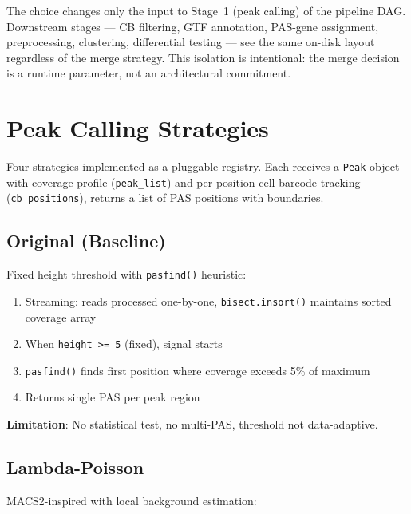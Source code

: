 \documentclass[11pt,a4paper]{article}
\begin{document}
The choice changes only the input to Stage~1 (peak calling) of the pipeline
DAG. Downstream stages --- CB filtering, GTF annotation, PAS-gene assignment,
preprocessing, clustering, differential testing --- see the same on-disk
layout regardless of the merge strategy. This isolation is intentional:
the merge decision is a runtime parameter, not an architectural commitment.

\section{Peak Calling Strategies}
\label{sec:peak_calling}

Four strategies implemented as a pluggable registry. Each receives a \texttt{Peak}
object with coverage profile (\texttt{peak\_list}) and per-position cell barcode
tracking (\texttt{cb\_positions}), returns a list of PAS positions with boundaries.

\subsection{Original (Baseline)}

Fixed height threshold with \texttt{pasfind()} heuristic:

\begin{enumerate}
  \item Streaming: reads processed one-by-one, \texttt{bisect.insort()} maintains
        sorted coverage array
  \item When \texttt{height >= 5} (fixed), signal starts
  \item \texttt{pasfind()} finds first position where coverage exceeds 5\% of maximum
  \item Returns single PAS per peak region
\end{enumerate}

\textbf{Limitation}: No statistical test, no multi-PAS, threshold not data-adaptive.

\subsection{Lambda-Poisson}

MACS2-inspired with local background estimation:
\end{document}
